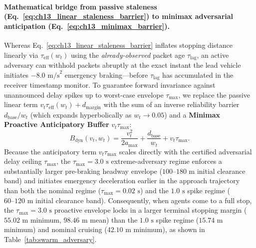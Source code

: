 \paragraph{Mathematical bridge from passive staleness (Eq.~\ref{eq:ch13_linear_staleness_barrier}) to minimax adversarial anticipation (Eq.~\ref{eq:ch13_minimax_barrier}).}
Whereas Eq.~\eqref{eq:ch13_linear_staleness_barrier} inflates stopping distance linearly via $\tau_{\mathrm{eff}}(w_t)$ using the \emph{already-observed} packet age $\tau_{\mathrm{lag}}$, an active adversary can withhold packets abruptly at the exact instant the lead vehicle initiates $-8.0\text{ m/s}^2$ emergency braking---before $\tau_{\mathrm{lag}}$ has accumulated in the receiver timestamp monitor. To guarantee forward invariance against unannounced delay spikes up to worst-case envelope $\tau_{\max}$, we replace the passive linear term $v_t \tau_{\mathrm{eff}}(w_t) + d_{\mathrm{margin}}$ with the sum of an inverse reliability barrier $d_{\mathrm{base}}/w_t$ (which expands hyperbolically as $w_t \to 0.05$) and a \textbf{Minimax Proactive Anticipatory Buffer} $v_t \tau_{\max}$:
\begin{equation}
\label{eq:ch13_minimax_barrier}
B_{\mathrm{dyn}}(v_t, w_t) = \frac{v_t^2}{2 a_{\max}} + \frac{d_{\mathrm{base}}}{w_t} + v_t \tau_{\max}.
\end{equation}
Because the anticipatory term $v_t \tau_{\max}$ scales directly with the certified adversarial delay ceiling $\tau_{\max}$, the $\tau_{\max} = 3.0\text{ s}$ extreme-adversary regime enforces a substantially larger pre-braking headway envelope ($100\text{--}180\text{ m}$ initial clearance band) and initiates emergency deceleration earlier in the approach trajectory than both the nominal regime ($\tau_{\max} = 0.02\text{ s}$) and the $1.0\text{ s}$ spike regime ($60\text{--}120\text{ m}$ initial clearance band). Consequently, when agents come to a full stop, the $\tau_{\max} = 3.0\text{ s}$ proactive envelope locks in a larger terminal stopping margin ($55.02\text{ m}$ minimum, $98.46\text{ m}$ mean) than the $1.0\text{ s}$ spike regime ($15.74\text{ m}$ minimum) and nominal cruising ($42.10\text{ m}$ minimum), as shown in Table~\ref{tab:swarm_adversary}.

\begin{table}[htbp]
\centering
\caption{Swarm Safety Under Active Adversarial Latency Attacks (100,000 Parallel Agents)}
\label{tab:swarm_adversary}
\end{table}

